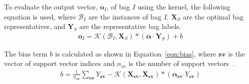 \documentclass[reqno]{vcuthesis}
\newcommand{\spa}[1]{\mathcal{#1}}
\numberwithin{equation}{chapter}
\begin{document}
To evaluate the output vector, $\bm o_I$, of bag $I$ using the kernel, the following equation is used, where $\mathcal{B}_I$ are the instances of bag $I$, $\bm X_S$ are the optimal bag representatives, and $\bm Y_S$ are the representative bag labels.
\begin{align}
\bm o_I = \spa{K}(\mathcal{B}_I,\bm X_S)*(\bm\alpha \cdot \bm Y_S) + b
\end{align}

The bias term $b$ is calculated as shown in Equation~\eqref{eqn:bias}, where $\bm{sv}$ is the vector of support vector indices and $n_{sv}$ is the number of support vectors~\cite{Huang2006}.
\begin{align}
\label{eqn:bias}
b = \frac{1}{n_{\bm{sv}}}\sum_{\bm{sv}} Y_{\bm{sv}} - \spa{K}(\bm X_{\bm{sv}},\bm X_{\bm{sv}})*(\bm \alpha_{\bm{sv}}\bm\cdot Y_{\bm{sv}})
\end{align}
\end{document}
